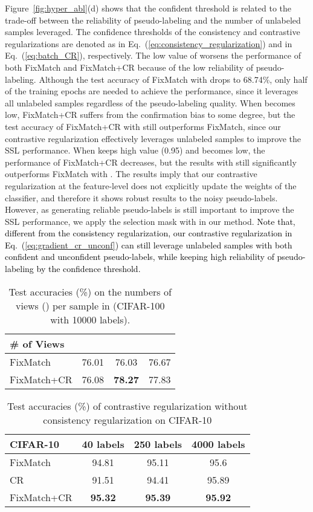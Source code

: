\documentclass[letterpaper]{article} \usepackage{aaai22}  \usepackage{times}  \usepackage{helvet}  \usepackage{courier}  \usepackage[hyphens]{url}  \usepackage{graphicx} \urlstyle{rm} \def\UrlFont{\rm}  \usepackage{natbib}  \usepackage{caption} \DeclareCaptionStyle{ruled}{labelfont=normalfont,labelsep=colon,strut=off} \frenchspacing  \setlength{\pdfpagewidth}{8.5in}  \setlength{\pdfpageheight}{11in}  \usepackage{algorithm}
\begin{document}
Figure~\ref{fig:hyper_abl}(d) shows that the confident threshold is related to the trade-off between the reliability of pseudo-labeling and the number of unlabeled samples leveraged.
The confidence thresholds of the consistency and contrastive regularizations are denoted as  in Eq.~(\ref{eq:consistency_regularization}) and  in Eq.~(\ref{eq:batch_CR}), respectively.
The low value of  worsens the performance of both FixMatch and FixMatch+CR because of the low reliability of pseudo-labeling.
Although the test accuracy of FixMatch with  drops to 68.74\%, only half of the training epochs are needed to achieve the performance, since it leverages all unlabeled samples regardless of the pseudo-labeling quality.
When  becomes low, FixMatch+CR suffers from the confirmation bias to some degree, but the test accuracy of FixMatch+CR with  still outperforms FixMatch, since our contrastive regularization effectively leverages unlabeled samples to improve the SSL performance.
When  keeps high value (0.95) and  becomes low, the performance of FixMatch+CR decreases, but the results with  still significantly outperforms FixMatch with .
The results imply that our contrastive regularization at the feature-level does not explicitly update the weights of the classifier, and therefore it shows robust results to the noisy pseudo-labels. 
However, as generating reliable pseudo-labels is still important to improve the SSL performance, we apply the selection mask with  in our method.
\textcolor{black}{Note that, different from the consistency regularization, our contrastive regularization in Eq.~(\ref{eq:gradient_cr_unconf}) can still leverage unlabeled samples with both confident and unconfident pseudo-labels, while keeping high reliability of pseudo-labeling by the confidence threshold.}

\begin{table} \centering
\footnotesize
\caption{Test accuracies (\%) on the numbers of views () per sample in  (CIFAR-100 with 10000 labels).}
\label{tab:abl_view}
\begin{tabular}{l|ccc}
\toprule
\# of Views  &  &  &  \\ \hline
FixMatch & 76.01 & 76.03 & 76.67 \\
FixMatch+CR & 76.08 & \textbf{78.27} & 77.83 \\
\bottomrule
\end{tabular}
\end{table}


\begin{table} \centering
\caption{Test accuracies (\%) of contrastive regularization without consistency regularization on CIFAR-10}
\label{tab:cs_cr}
\footnotesize
\begin{tabular}{l|ccc}
\toprule
CIFAR-10  & 40 labels & 250 labels & 4000 labels \\ \hline
FixMatch & 94.81 & 95.11 & 95.6 \\
CR  & 91.51 & 94.41 & 95.89 \\
FixMatch+CR & \textbf{95.32} & \textbf{95.39} & \textbf{95.92} \\
\bottomrule
\end{tabular}
\vspace{-0.1in}
\end{table}
\end{document}
